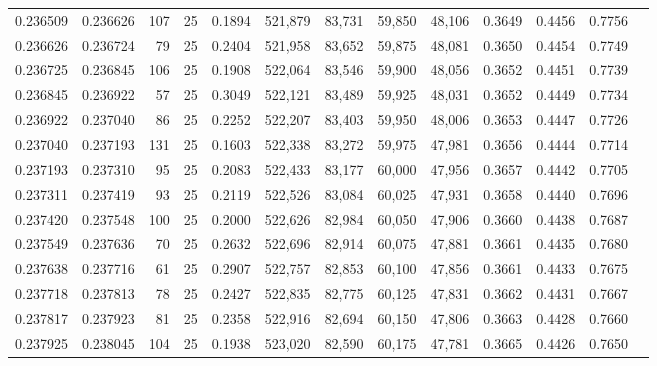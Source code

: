 \begin{tabular}{rrrrrrrrrrrrr}
0.236509 & 0.236626 &   107 &  25 &                                     0.1894 & 521,879 &  83,731 &  59,850 &  48,106 & 0.3649 & 0.4456 & 0.7756 \\
0.236626 & 0.236724 &    79 &  25 &                                     0.2404 & 521,958 &  83,652 &  59,875 &  48,081 & 0.3650 & 0.4454 & 0.7749 \\
0.236725 & 0.236845 &   106 &  25 &                                     0.1908 & 522,064 &  83,546 &  59,900 &  48,056 & 0.3652 & 0.4451 & 0.7739 \\
0.236845 & 0.236922 &    57 &  25 &                                     0.3049 & 522,121 &  83,489 &  59,925 &  48,031 & 0.3652 & 0.4449 & 0.7734 \\
0.236922 & 0.237040 &    86 &  25 &                                     0.2252 & 522,207 &  83,403 &  59,950 &  48,006 & 0.3653 & 0.4447 & 0.7726 \\
0.237040 & 0.237193 &   131 &  25 &                                     0.1603 & 522,338 &  83,272 &  59,975 &  47,981 & 0.3656 & 0.4444 & 0.7714 \\
0.237193 & 0.237310 &    95 &  25 &                                     0.2083 & 522,433 &  83,177 &  60,000 &  47,956 & 0.3657 & 0.4442 & 0.7705 \\
0.237311 & 0.237419 &    93 &  25 &                                     0.2119 & 522,526 &  83,084 &  60,025 &  47,931 & 0.3658 & 0.4440 & 0.7696 \\
0.237420 & 0.237548 &   100 &  25 &                                     0.2000 & 522,626 &  82,984 &  60,050 &  47,906 & 0.3660 & 0.4438 & 0.7687 \\
0.237549 & 0.237636 &    70 &  25 &                                     0.2632 & 522,696 &  82,914 &  60,075 &  47,881 & 0.3661 & 0.4435 & 0.7680 \\
0.237638 & 0.237716 &    61 &  25 &                                     0.2907 & 522,757 &  82,853 &  60,100 &  47,856 & 0.3661 & 0.4433 & 0.7675 \\
0.237718 & 0.237813 &    78 &  25 &                                     0.2427 & 522,835 &  82,775 &  60,125 &  47,831 & 0.3662 & 0.4431 & 0.7667 \\
0.237817 & 0.237923 &    81 &  25 &                                     0.2358 & 522,916 &  82,694 &  60,150 &  47,806 & 0.3663 & 0.4428 & 0.7660 \\
0.237925 & 0.238045 &   104 &  25 &                                     0.1938 & 523,020 &  82,590 &  60,175 &  47,781 & 0.3665 & 0.4426 & 0.7650 \\

\end{tabular}
